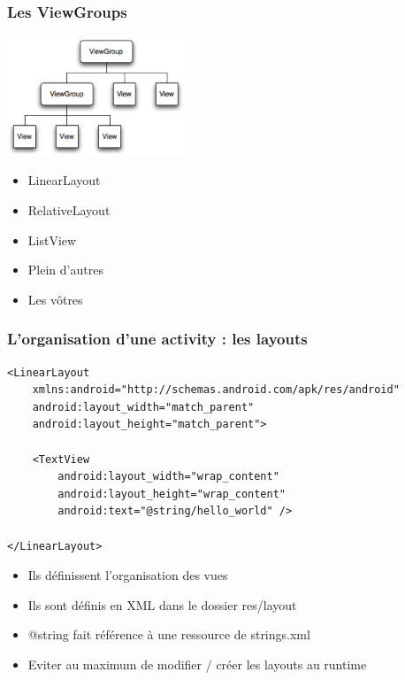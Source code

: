 \documentclass{beamer}
\begin{document}
\begin{frame}[fragile]
\frametitle{Les ViewGroups}
  \includegraphics[width=150pt]{img/viewgroup.png}
  \begin{itemize}
 \item LinearLayout
 \item RelativeLayout
 \item ListView
 \item Plein d'autres
 \item Les vôtres
 \end{itemize}
\end{frame}
\begin{frame}[fragile]
\frametitle{L'organisation d'une activity : les layouts} 
\begin{lstlisting}
<LinearLayout 
	xmlns:android="http://schemas.android.com/apk/res/android"
    android:layout_width="match_parent"
    android:layout_height="match_parent">

    <TextView
        android:layout_width="wrap_content"
        android:layout_height="wrap_content"
        android:text="@string/hello_world" />
        
</LinearLayout>
\end{lstlisting}
 \begin{itemize}
  \item Ils définissent l'organisation des vues
 \item Ils sont définis en XML dans le dossier res/layout
 \item @string fait référence à une ressource de strings.xml
 \item Eviter au maximum de modifier / créer les layouts au runtime
 \end{itemize}
\end{frame}
\end{document}
